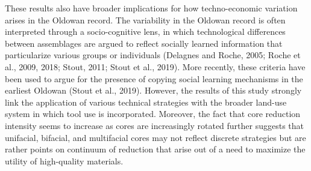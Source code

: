 \documentclass[]{elsarticle} %
\begin{document}
These results also have broader implications for how techno-economic
variation arises in the Oldowan record. The variability in the Oldowan
record is often interpreted through a socio-cognitive lens, in which
technological differences between assemblages are argued to reflect
socially learned information that particularize various groups or
individuals (\hspace{0pt}Delagnes and Roche, 2005\hspace{0pt};
\hspace{0pt}Roche et al., 2009\hspace{0pt},
\hspace{0pt}2018\hspace{0pt}; \hspace{0pt}Stout, 2011\hspace{0pt};
\hspace{0pt}Stout et al., 2019\hspace{0pt}). More recently, these
criteria have been used to argue for the presence of copying social
learning mechanisms in the earliest Oldowan (\hspace{0pt}Stout et al.,
2019\hspace{0pt}). However, the results of this study strongly link the
application of various technical strategies with the broader land-use
system in which tool use is incorporated. Moreover, the fact that core
reduction intensity seems to increase as cores are increasingly rotated
further suggests that unifacial, bifacial, and multifacial cores may not
reflect discrete strategies but are rather points on continuum of
reduction that arise out of a need to maximize the utility of
high-quality materials.
\end{document}
